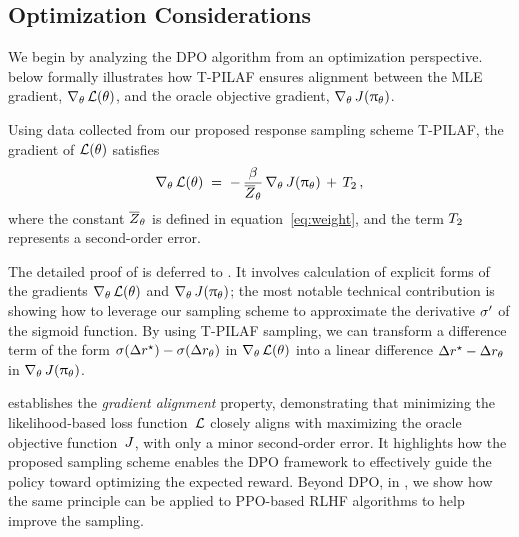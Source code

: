 \subsection{Optimization Considerations}
            \label{sec:theory_opt}



            
We begin by analyzing the DPO algorithm from an optimization perspective.
{ below formally illustrates how T-PILAF ensures alignment between the MLE gradient, $\nabla_{\theta} \,  \mathcal{L}(\theta)$, and the oracle objective gradient, $\nabla_{\theta} \,  J(\uppi_{\theta})$.}

%
%
\begin{theorem}
\label{thm:grad}
  Using data collected from our proposed response sampling scheme T-PILAF, the gradient of $ \mathcal{L}(\theta) $ satisfies
\begin{align*}
    \nabla_{\theta} \,  \mathcal{L}(\theta) \; = \;
    - \, \frac{\beta}{\overline{Z}_{\theta}} \, \nabla_{\theta} \,  J(\uppi_{\theta}) \, + \, T_2 \, ,
\end{align*}
where the constant $ \overline{Z}_{\theta} $ is defined in equation~\eqref{eq:weight}, and the term $ \Term_2%
$ represents a second-order error.
\end{theorem}
The detailed proof of  is deferred to . 
It involves calculation of explicit forms of the gradients $\nabla_{\theta} \,  \mathcal{L}(\theta)$ and $\nabla_{\theta} \,  J(\uppi_{\theta})$; the most notable technical contribution is showing how to leverage our sampling scheme to approximate the derivative $\sigma'$ of the sigmoid function. By using T-PILAF sampling, we can transform a difference term of the form $\sigma ( \Delta r^{\star} ) - \sigma ( \Delta r_{\theta} )$ in $\nabla_{\theta} \,  \mathcal{L}(\theta)$ into a linear difference $\Delta r^{\star} - \Delta r_{\theta}$ in $\nabla_{\theta} \,  J(\uppi_{\theta})$.

 establishes the \emph{gradient alignment} property, demonstrating that minimizing the likelihood-based loss function~$\mathcal{L}$ closely aligns with maximizing the oracle objective function~$J$, with only a minor second-order error. It highlights how the proposed sampling scheme enables the DPO framework to effectively guide the policy toward optimizing the expected reward.
%
Beyond DPO, in , we show how the same principle can be applied to PPO-based RLHF algorithms to help improve the sampling. %
		

